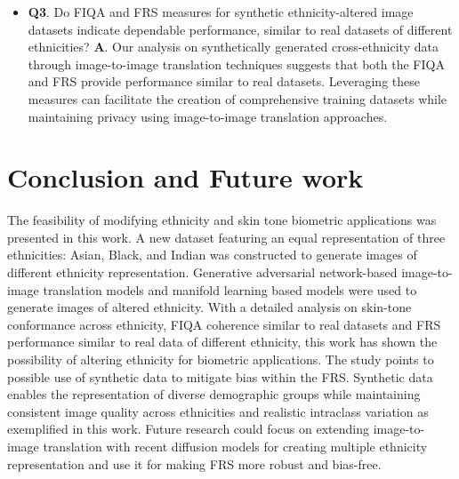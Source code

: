 {\begin{itemize}[noitemsep]
    \textbf{A}. Based on the extensive experiments presented in Figure \ref{fig:skintoneita}, it is evident that ITA remains relatively stable for face images with altered ethnicity utilizing StarGAN and FGAN, similar to real face images. This observation suggests synthetic alteration approaches effectively transfer skin tones to different ethnicities. However, a deviation from this stability is noticeable for black ethnicity when generated using CycleGAN suggesting further investigations. CycleGAN introduces variations in ITA when changing ethnicities, potentially affecting skin tone representation accuracy for certain ethnicities compared with real faces.
    
    \item \textbf{Q3}. Do FIQA and FRS measures for synthetic ethnicity-altered image datasets indicate dependable performance, similar to real datasets of different ethnicities? 
    \textbf{A}. Our analysis on synthetically generated cross-ethnicity data through image-to-image translation techniques suggests that both the FIQA and FRS provide performance similar to real datasets. Leveraging these measures can facilitate the creation of comprehensive training datasets while maintaining privacy using image-to-image translation approaches.
    
\end{itemize}
		\section{Conclusion and Future work}\label{sec:conclusion}
		The feasibility of modifying ethnicity and skin tone biometric applications was presented in this work. A new dataset featuring an equal representation of three ethnicities: Asian, Black, and Indian was constructed to generate images of different ethnicity representation. Generative adversarial network-based image-to-image translation models and manifold learning based models were used to generate images of altered ethnicity. With a detailed analysis on skin-tone conformance across ethnicity, FIQA coherence similar to real datasets and FRS performance similar to real data of different ethnicity, this work has shown the possibility of altering ethnicity for biometric applications. The study points to possible use of synthetic data to mitigate bias within the FRS. Synthetic data enables the representation of diverse demographic groups while maintaining consistent image quality across ethnicities and realistic intraclass variation as exemplified in this work. Future research could focus on extending image-to-image translation with recent diffusion models for creating multiple ethnicity representation and use it for making FRS more robust and bias-free.
  
}
